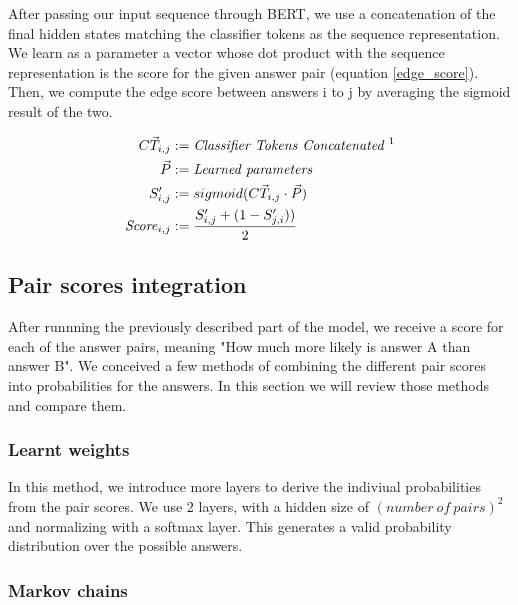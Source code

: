 \documentclass{article}
\begin{document}
After passing our input sequence through BERT, we use a concatenation of the final hidden states matching the classifier tokens as the sequence representation. We learn as a parameter a vector whose dot product with the sequence representation is the score for the given answer pair (equation \ref{edge_score}). Then, we compute the edge score between answers i to j by averaging the sigmoid result of the two. 



\begin{equation}
  \begin{aligned}
      \vec{CT_{i,j}} &:= \text{\textit{Classifier Tokens Concatenated \footnotemark}}\\ 
    \vec{P} &:= \text{\textit{Learned parameters}}\\
    S'_{i,j} &:= sigmoid(\vec{CT_{i,j}} \cdot \vec{P})\\
    \text{\textit{Score}}_{i,j} &:= \frac{S'_{i,j} + (1-S'_{j,i}))}{2}
  \end{aligned}
  \label{edge_score}
\end{equation}


\subsection{Pair scores integration}

After runnning the previously described part of the model, we receive a score for each of the answer pairs, meaning "How much more likely is answer A than answer B". We conceived a few methods of combining the different pair scores into probabilities for the answers. In this section we will review those methods and compare them.

\subsubsection{Learnt weights}

In this method, we introduce more layers to derive the indiviual probabilities from the pair scores. We use 2 layers, with a hidden size of $ (number\ of\ pairs)^2 $ and normalizing with a softmax layer. This generates a valid probability distribution over the possible answers.

\subsubsection{Markov chains}
\end{document}
